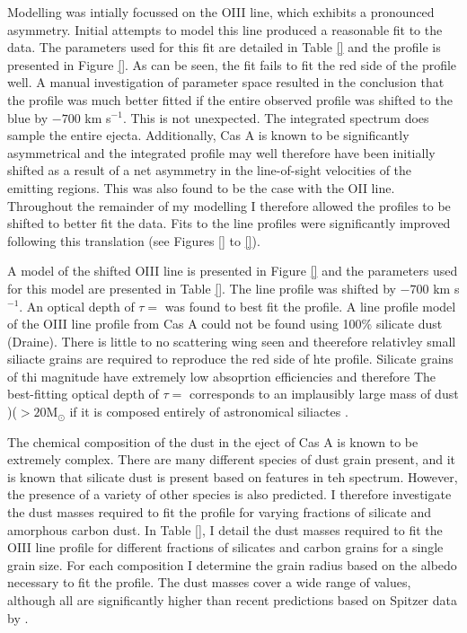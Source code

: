 Modelling was intially focussed on the OIII line, which exhibits a pronounced asymmetry.  Initial attempts to model this line produced a reasonable fit to the data.  The parameters used for this fit are detailed in Table \ref{} and the profile is presented in Figure \ref{}.  As can be seen, the fit fails to fit the red side of the profile well.  A manual investigation of parameter space resulted in the conclusion that the profile was much better fitted if the entire observed profile was shifted to the blue by $-700$ km s$^{-1}$.  This is not unexpected.  The integrated spectrum does sample the entire ejecta.  Additionally, Cas A is known to be significantly asymmetrical \citep{} and the integrated profile may well therefore have been initially shifted as a result of a net asymmetry in the line-of-sight velocities of the emitting regions.  This was also found to be the case with the OII line.  Throughout the remainder of my modelling I therefore allowed the profiles to be shifted to better fit the data.  Fits to the line profiles were significantly improved following this translation (see Figures \ref{} to \ref{}).

A model of the shifted OIII line is presented in Figure \ref{} and the parameters used for   this model are presented in Table \ref{}.  The line profile was shifted by $-700$ km s$^{-1}$.  An optical depth of $\tau=$ was found to best fit the profile.  A line profile model of the OIII line profile from Cas A could not be found using 100\% silicate dust (Draine).  There is little to no scattering wing seen and theerefore relativley small siliacte grains are required to reproduce the red side of hte profile.  Silicate grains of thi magnitude have extremely low absoprtion efficiencies and therefore The best-fitting optical depth of $\tau=$ corresponds to an implausibly large mass of dust )($>20$M$_{\odot}$ if it is composed entirely of astronomical siliactes \citep{Draine1984}.

The chemical composition of the dust in the eject of Cas A is known to be extremely complex.  There are many different species of dust grain present, and it is known that silicate dust is present based on features in teh spectrum.  However, the presence of a variety of other species is also predicted.  I therefore investigate the dust masses required to fit the profile for varying fractions of silicate and amorphous carbon dust.  In Table \ref{}, I detail the dust masses required to fit the OIII line profile for different fractions of silicates and carbon grains for a single grain size.  For each composition I determine the grain radius based on the albedo necessary to fit the profile.  The dust masses cover a wide range of values, although all are significantly higher than recent predictions based on Spitzer data by \citep{}.  

